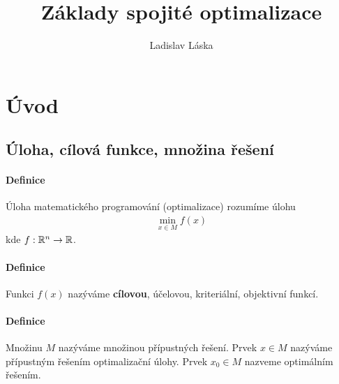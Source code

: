 \documentclass[a4paper,12pt,titlepage]{article}
\title{Základy spojité optimalizace}
\author{Ladislav Láska}
\begin{document}
\maketitle
\newpage
\tableofcontents
\newpage


\section{Úvod}
\setcounter{equation}{0}
\subsection{Úloha, cílová funkce, množina řešení}
\setcounter{equation}{0}
\paragraph{Definice}
Úloha matematického programování (optimalizace) rozumíme úlohu
\begin{align*}
	\min_{x\in M} f(x)
\end{align*}
kde $f: \mathbb{R}^n \to \mathbb{R}$.
\paragraph{Definice}
Funkci $f(x)$ nazýváme \textbf{cílovou}, účelovou, kriteriální, objektivní funkcí.
\paragraph{Definice}
Množinu $M$ nazýváme množinou přípustných řešení. Prvek $x \in M$ nazýváme
přípustným řešením optimalizační úlohy. Prvek $x_0 \in M$ nazveme optimálním
řešením.
\end{document}
